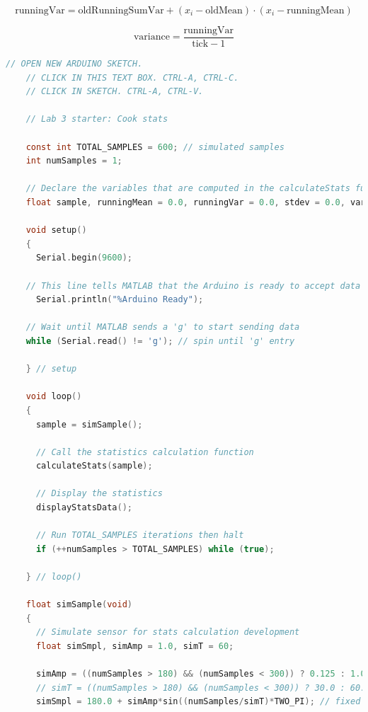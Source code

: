 \documentclass[journal]{IEEEtran}
\begin{document}
\begin{equation*}
    \text{runningVar} = \text{oldRunningSumVar} + (x_i - \text{oldMean}) \cdot (x_i - \text{runningMean})
\end{equation*}

\begin{equation*}
    \text{variance} = \frac{\text{runningVar}}{\text{tick} - 1}
\end{equation*}


\begin{lstlisting}[language=c]
    // OPEN NEW ARDUINO SKETCH.
    // CLICK IN THIS TEXT BOX. CTRL-A, CTRL-C.
    // CLICK IN SKETCH. CTRL-A, CTRL-V.
    
    // Lab 3 starter: Cook stats
    
    const int TOTAL_SAMPLES = 600; // simulated samples
    int numSamples = 1;
    
    // Declare the variables that are computed in the calculateStats function
    float sample, runningMean = 0.0, runningVar = 0.0, stdev = 0.0, variance=0.0;
    
    void setup()
    {
      Serial.begin(9600);
     
    // This line tells MATLAB that the Arduino is ready to accept data
      Serial.println("%Arduino Ready");  
    
    // Wait until MATLAB sends a 'g' to start sending data
    while (Serial.read() != 'g'); // spin until 'g' entry
    
    } // setup
    
    void loop()
    { 
      sample = simSample();
      
      // Call the statistics calculation function
      calculateStats(sample);
      
      // Display the statistics
      displayStatsData();
      
      // Run TOTAL_SAMPLES iterations then halt
      if (++numSamples > TOTAL_SAMPLES) while (true);
      
    } // loop()
    
    float simSample(void)
    {
      // Simulate sensor for stats calculation development
      float simSmpl, simAmp = 1.0, simT = 60;
      
      simAmp = ((numSamples > 180) && (numSamples < 300)) ? 0.125 : 1.0; // burst amplitude
      // simT = ((numSamples > 180) && (numSamples < 300)) ? 30.0 : 60.0; // burst frequency
      simSmpl = 180.0 + simAmp*sin((numSamples/simT)*TWO_PI); // fixed amplitude, frequency
      

\end{lstlisting}
\end{document}
